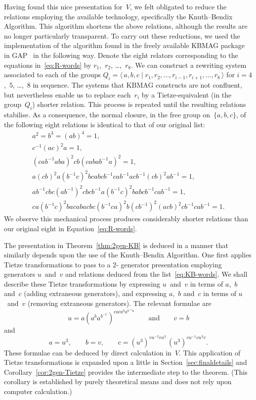 \documentclass[a4paper,11pt]{article}
\numberwithin{equation}{section}
\newcommand{\GAP}{\textsf{GAP}}
\newcommand{\nbd}{\nobreakdash-}
\begin{document}
Having found this nice presentation for~$V$, we felt obligated to
reduce the relations employing the available technology, specifically the
Knuth--Bendix Algorithm.  This algorithm shortens the above relations,
although the results are no longer particularly transparent.  To carry
out these reductions, we used the implementation of the algorithm
found in the freely available KBMAG package~\cite{KBMAG} in
\GAP~\cite{GAP} in the following way.  Denote the eight relators
corresponding to the equations in~\eqref{eq:R-words} by
$r_{1}$,~$r_{2}$, \dots,~$r_{8}$.  We can construct a rewriting system
associated to each of the groups $Q_{i} = \langle \, a,b,c \mid
r_{1},r_{2},\dots,r_{i-1},r_{i+1},\dots,r_{8} \, \rangle$ for $i =
4$,~$5$, \dots,~$8$ in sequence.  The systems that KBMAG constructs
are not confluent, but nevertheless enable us to replace each~$r_{i}$
by a Tietze-equivalent (in the group~$Q_{i}$) shorter relation.  This
process is repeated until the resulting relations stabilise.  As a
consequence, the normal closure, in the free group on~$\{a,b,c\}$, of
the following eight relations is identical to that of our original
list:
\begin{equation}
\begin{gathered}
  a^{2} = b^{3} = (ab)^{4} = 1, \\
  c^{-1}(ac)^{2}a = 1, \\
  (cab^{-1}aba)^{2}cb(cabab^{-1}a)^{2} = 1, \\
  a(cb)^{2}a(b^{-1}c)^{2}bcabcb^{-1}cab^{-1}acb^{-1}(cb)^{2}ab^{-1} =
  1, \\
  ab^{-1}cbc(ab^{-1})^{2}cbcb^{-1}a(b^{-1}c)^{2}babcb^{-1}cab^{-1} =
  1, \\
  ca(b^{-1}c)^{2}bacabacbc(b^{-1}ca)^{2}b(cb^{-1})^{2}(acb)^{2}cb^{-1}cab^{-1}
  = 1.
\end{gathered}
\label{eq:KB-words}
\end{equation}
We observe this mechanical process produces considerably shorter
relations than our original eight in Equation~\eqref{eq:R-words}.

The presentation in Theorem~\ref{thm:2gen-KB} is deduced in a manner
that similarly depends upon the use of the Knuth--Bendix Algorithm.
One first applies Tietze transformations to pass to a $2$\nbd
generator presentation employing generators $u$~and~$v$ and relations
deduced from the list~\eqref{eq:KB-words}.  We shall describe these
Tietze transformations by expressing $u$~and~$v$ in terms of $a$,~$b$
and~$c$ (adding extraneous generators), and expressing $a$,~$b$
and~$c$ in terms of $u$~and~$v$ (removing extraneous generators).  The
relevant formulae are
\[
u = a(a^ba^{b^{-1}})^{caca^{b}a^{b^{-1}a}}
\qquad \text{and}\qquad
v = b
\]
and
\[
a = u^{3}, \qquad
b = v, \qquad
c = (u^{3})^{vu^{-2}vu^{3}} \, (u^{3})^{vu^{-1}vu^{3}v}.
\]
These formulae can be deduced by direct calculation in~$V$.  This
application of Tietze transformations is expanded upon a little in
Section~\ref{sec:finaldetails} and Corollary~\ref{cor:2gen-Tietze}
provides the intermediate step to the theorem.  (This corollary is
established by purely theoretical means and does not rely upon
computer calculation.)
\end{document}
